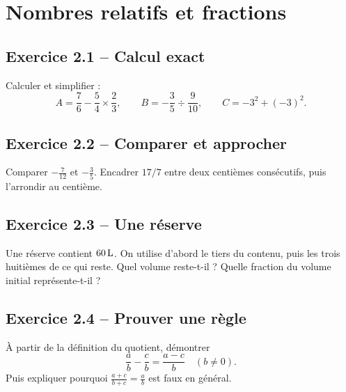 \chapter{Nombres relatifs et fractions}
\label{exercices:02}
\section*{Exercice 2.1 -- Calcul exact}
Calculer et simplifier :
\[A=\frac76-\frac54\times\frac23,\qquad B=-\frac35\div\frac9{10},\qquad C=-3^2+(-3)^2.\]

\section*{Exercice 2.2 -- Comparer et approcher}
Comparer $-\frac7{12}$ et $-\frac35$. Encadrer $17/7$ entre deux centièmes consécutifs, puis l'arrondir au centième.

\section*{Exercice 2.3 -- Une réserve}
Une réserve contient $60\,\mathrm{L}$. On utilise d'abord le tiers du contenu, puis les trois huitièmes de ce qui reste. Quel volume reste-t-il ? Quelle fraction du volume initial représente-t-il ?

\section*{Exercice 2.4 -- Prouver une règle}
À partir de la définition du quotient, démontrer
\[\frac ab-\frac cb=\frac{a-c}{b}\quad(b\ne0).\]
Puis expliquer pourquoi $\frac{a+c}{b+c}=\frac ab$ est faux en général.
